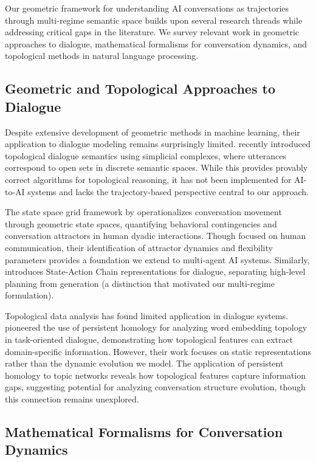 \documentclass[11pt,letterpaper]{article}
\begin{document}
Our geometric framework for understanding AI conversations as trajectories through multi-regime semantic space builds upon several research threads while addressing critical gaps in the literature. We survey relevant work in geometric approaches to dialogue, mathematical formalisms for conversation dynamics, and topological methods in natural language processing.

\subsection{Geometric and Topological Approaches to Dialogue}

Despite extensive development of geometric methods in machine learning, their application to dialogue modeling remains surprisingly limited. \citep{ballus2024topological} recently introduced topological dialogue semantics using simplicial complexes, where utterances correspond to open sets in discrete semantic spaces. While this provides provably correct algorithms for topological reasoning, it has not been implemented for AI-to-AI systems and lacks the trajectory-based perspective central to our approach.

The state space grid framework by \citep{brinberg2024state} operationalizes conversation movement through geometric state spaces, quantifying behavioral contingencies and conversation attractors in human dyadic interactions. Though focused on human communication, their identification of attractor dynamics and flexibility parameters provides a foundation we extend to multi-agent AI systems. Similarly, \citep{sage2025steering} introduces State-Action Chain representations for dialogue, separating high-level planning from generation (a distinction that motivated our multi-regime formulation).

Topological data analysis has found limited application in dialogue systems. \citep{vukovic2022dialogue} pioneered the use of persistent homology for analyzing word embedding topology in task-oriented dialogue, demonstrating how topological features can extract domain-specific information. However, their work focuses on static representations rather than the dynamic evolution we model. The application of persistent homology to topic networks \citep{hopp2024persistent} reveals how topological features capture information gaps, suggesting potential for analyzing conversation structure evolution, though this connection remains unexplored.

\subsection{Mathematical Formalisms for Conversation Dynamics}
\end{document}
